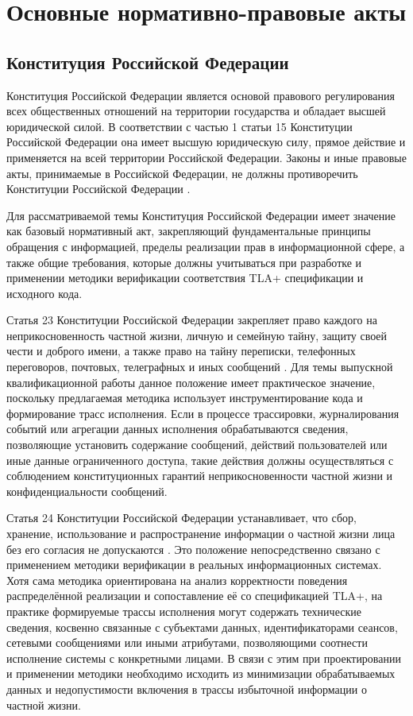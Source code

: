 \section{Основные нормативно-правовые акты}

\subsection{Конституция Российской Федерации}

Конституция Российской Федерации является основой правового регулирования
всех общественных отношений на территории государства и обладает высшей
юридической силой. В соответствии с частью 1 статьи 15 Конституции
Российской Федерации она имеет высшую юридическую силу, прямое действие и
применяется на всей территории Российской Федерации. Законы и иные
правовые акты, принимаемые в Российской Федерации, не должны противоречить
Конституции Российской Федерации \cite{constitution_rf}.

Для рассматриваемой темы Конституция Российской Федерации имеет значение
как базовый нормативный акт, закрепляющий фундаментальные принципы
обращения с информацией, пределы реализации прав в информационной сфере, а
также общие требования, которые должны учитываться при разработке и
применении методики верификации соответствия TLA+ спецификации и исходного
кода.

Статья 23 Конституции Российской Федерации закрепляет право каждого на
неприкосновенность частной жизни, личную и семейную тайну, защиту своей
чести и доброго имени, а также право на тайну переписки, телефонных
переговоров, почтовых, телеграфных и иных сообщений \cite{constitution_rf}.
Для темы выпускной квалификационной работы данное положение имеет
практическое значение, поскольку предлагаемая методика использует
инструментирование кода и формирование трасс исполнения. Если в процессе
трассировки, журналирования событий или агрегации данных исполнения
обрабатываются сведения, позволяющие установить содержание сообщений,
действий пользователей или иные данные ограниченного доступа, такие
действия должны осуществляться с соблюдением конституционных гарантий
неприкосновенности частной жизни и конфиденциальности сообщений.

Статья 24 Конституции Российской Федерации устанавливает, что сбор,
хранение, использование и распространение информации о частной жизни лица
без его согласия не допускаются \cite{constitution_rf}. Это положение
непосредственно связано с применением методики верификации в реальных
информационных системах. Хотя сама методика ориентирована на анализ
корректности поведения распределённой реализации и сопоставление её со
спецификацией TLA+, на практике формируемые трассы исполнения могут
содержать технические сведения, косвенно связанные с субъектами данных,
идентификаторами сеансов, сетевыми сообщениями или иными атрибутами,
позволяющими соотнести исполнение системы с конкретными лицами. В связи с
этим при проектировании и применении методики необходимо исходить из
минимизации обрабатываемых данных и недопустимости включения в трассы
избыточной информации о частной жизни.

